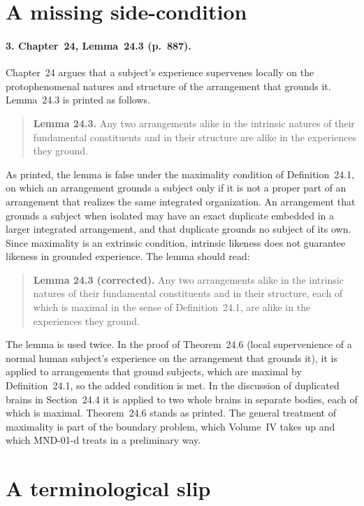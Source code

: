 \documentclass{situationist-preprint}
\begin{document}
\section{A missing side-condition}

\paragraph{3. Chapter~24, Lemma~24.3 (p.~887).} Chapter~24 argues that a subject's experience supervenes locally on the protophenomenal natures and structure of the arrangement that grounds it. Lemma~24.3 is printed as follows.

\begin{quote}\small
\textbf{Lemma 24.3.} Any two arrangements alike in the intrinsic natures of their fundamental constituents and in their structure are alike in the experiences they ground.
\end{quote}

As printed, the lemma is false under the maximality condition of Definition~24.1, on which an arrangement grounds a subject only if it is not a proper part of an arrangement that realizes the same integrated organization. An arrangement that grounds a subject when isolated may have an exact duplicate embedded in a larger integrated arrangement, and that duplicate grounds no subject of its own. Since maximality is an extrinsic condition, intrinsic likeness does not guarantee likeness in grounded experience. The lemma should read:

\begin{quote}\small
\textbf{Lemma 24.3 (corrected).} Any two arrangements alike in the intrinsic natures of their fundamental constituents and in their structure, each of which is maximal in the sense of Definition~24.1, are alike in the experiences they ground.
\end{quote}

The lemma is used twice. In the proof of Theorem~24.6 (local supervenience of a normal human subject's experience on the arrangement that grounds it), it is applied to arrangements that ground subjects, which are maximal by Definition~24.1, so the added condition is met. In the discussion of duplicated brains in Section~24.4 it is applied to two whole brains in separate bodies, each of which is maximal. Theorem~24.6 stands as printed. The general treatment of maximality is part of the boundary problem, which Volume~IV takes up and which MND-01-d treats in a preliminary way.

\section{A terminological slip}
\end{document}
